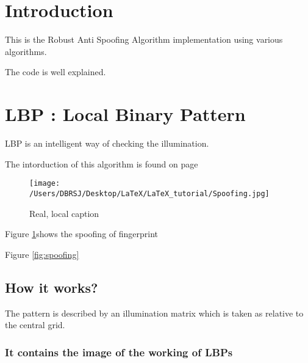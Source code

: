 \documentclass{article}
\begin{document}
\thispagestyle{empty}
\cleardoublepage %
\listoffigures
{} 
\cleardoublepage
{}
\setcounter{page}{1}


\section{Introduction}\label{sec:intro}
This is the Robust Anti Spoofing Algorithm implementation using various algorithms.

The code is well explained.
\lipsum[1]

\newpage %
\section{LBP : Local Binary Pattern}
LBP is an intelligent way of checking the illumination. 

The intorduction of this algorithm is found on page \pageref{sec:intro}

\begin{figure}[H]
	\centering
	\texttt{[image: /Users/DBRSJ/Desktop/LaTeX/LaTeX\_tutorial/Spoofing.jpg]}
	\caption[Optional caption]{Real, local caption} %
	\label{fig:Spoofing}
\end{figure}

Figure \ref{fig:Spoofing}shows the spoofing of fingerprint


Figure \ref{fig:spoofing}


\subsection{How it works?}
The pattern is described by an illumination matrix which is  taken as relative to the central grid.
\subsubsection{It contains the image of the working of LBPs}
\end{document}

